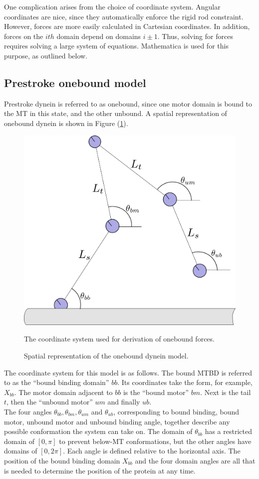 \documentclass[
11pt, %
english, %
singlespacing, %
headsepline, %
chapterinoneline, %
]{MastersDoctoralThesis} %
\begin{document}
One complication arises from the choice of coordinate system. Angular coordinates are nice, since they automatically enforce the rigid rod constraint. However, forces are more easily calculated in Cartesian coordinates. In addition, forces on the $ith$ domain depend on domains $i\pm1$. Thus, solving for forces requires solving a large system of equations. Mathematica is used for this purpose, as outlined below.\\

\subsection{Prestroke onebound model}
Prestroke dynein is referred to as onebound, since one motor domain is bound to the MT in this state, and the other unbound. A spatial representation of onebound dynein is shown in Figure (\ref{fig:derivation-onebound}).

\begin{figure}[h]
  \centering
  \includegraphics[width=.45\textwidth]{../../figures/derivation-onebound}
  \caption{Spatial representation of the onebound dynein model.}{The coordinate system used for derivation of onebound forces.}
  \label{fig:derivation-onebound}
\end{figure}

The coordinate system for this model is as follows. The bound MTBD is referred to as the ``bound binding domain'' $bb$. Its coordinates take the form, for example, $X_{bb}$. The motor domain adjacent to $bb$ is the ``bound motor'' $bm$. Next is the tail $t$, then the ``unbound motor'' $um$ and finally $ub$.\\

The four angles $\theta_{bb}, \theta_{bm}, \theta_{um}$ and $\theta_{ub}$, corresponding to bound binding, bound motor, unbound motor and unbound binding angle, together describe any possible conformation the system can take on. The domain of $\theta_{bb}$ has a restricted domain of $[0,\pi]$ to prevent below-MT conformations, but the other angles have domains of $[0,2\pi]$. Each angle is defined relative to the horizontal axis. The position of the bound binding domain $X_{bb}$ and the four domain angles are all that is needed to determine the position of the protein at any time.\\
\end{document}
